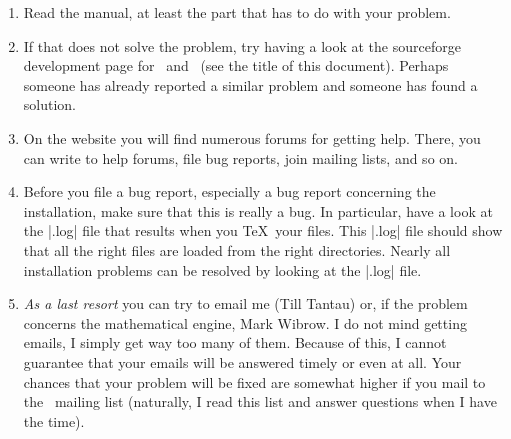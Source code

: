 \begin{enumerate}
\item
  Read the manual, at least the part that has to do with your problem.
\item
  If that does not solve the problem, try having a look at the
  sourceforge development page for \pgfname\ and \tikzname\ (see the
  title of this document). Perhaps someone has already reported a
  similar problem and someone has found a solution.
\item
  On the website you will find numerous forums for getting
  help. There, you can write to help forums, file bug reports, join
  mailing lists, and so on.
\item
  Before you file a bug report, especially a bug report concerning the
  installation, make sure that this is really a bug. In particular,
  have a look at the |.log| file that results when you \TeX\ your
  files. This |.log| file should show that all the right files are
  loaded from the right directories. Nearly all installation problems
  can be resolved by looking at the |.log| file.
\item
  \emph{As a last resort} you can try to email me (Till Tantau) or, if
  the problem concerns the mathematical engine, Mark Wibrow. I do
  not mind getting emails, I simply get way too many of them. Because
  of this, I cannot guarantee that your emails will be answered timely
  or even at all. Your chances that your problem will be fixed are
  somewhat higher if you mail to the \pgfname\ mailing list
  (naturally, I read this list and answer questions when I have the
  time).
\end{enumerate}

